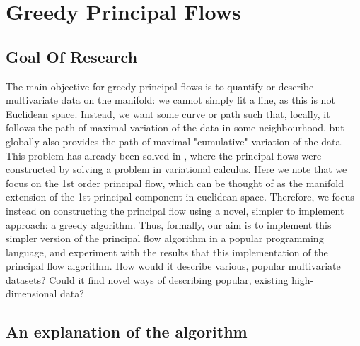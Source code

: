 \documentclass[12pt]{report}
\begin{document}
\chapter{Greedy Principal Flows}

\section{Goal Of Research}

The main objective for greedy principal flows is to quantify or describe 
multivariate data on the manifold: we cannot simply fit a line, 
as this is not Euclidean space.
Instead, we want some curve or path such that,
locally, it follows the path of maximal variation of the data in some neighbourhood, 
but globally also provides the path of maximal "cumulative" variation of the data.
This problem has already been solved in \cite{principalflow}, 
where the principal flows were constructed by 
solving a problem in variational calculus. Here we note that we focus on 
the 1st order principal flow, which can be thought of as 
the manifold extension of the 1st principal component in euclidean space.
Therefore, we focus instead on constructing the principal flow using a novel, 
simpler to implement approach: a greedy algorithm. 
Thus, formally, our aim is to implement this simpler version of the
principal flow algorithm in a popular programming language, 
and experiment with the results that this implementation of the
principal flow algorithm. How would it describe various, popular multivariate
datasets? Could it find novel ways of describing popular,
existing high-dimensional data?

\section{An explanation of the algorithm}
\end{document}
